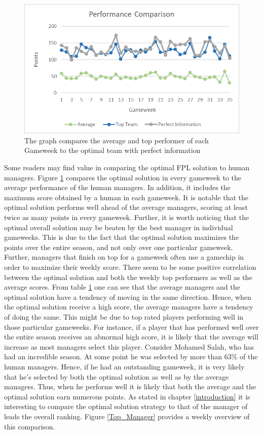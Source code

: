 \begin{figure}[H]
\label{fig:Comparison}
    \centering
    \includegraphics[scale=0.75]{fig/chapter_7/Comparison.png}
    \caption{The graph compares the average and top performer of each Gameweek to the optimal team with perfect information}
\label{Figure_Comparison}    
\end{figure}

Some readers may find value in comparing the optimal FPL solution to human managers. Figure \ref{Figure_Comparison} compares the optimal solution in every gameweek to the average performance of the human managers. In addition, it includes the maximum score obtained by a human in each gameweek. It is notable that the optimal solution performs well ahead of the average managers, scoring at least twice as many points in every gameweek. Further, it is worth noticing that the optimal overall solution may be beaten by the best manager in individual gameweeks. This is due to the fact that the optimal solution maximizes the points over the entire season, and not only over one particular gameweek. Further, managers that finish on top for a gameweek often use a gamechip in order to maximize their weekly score. 
\newpar
There seem to be some positive correlation between the optimal solution and both the weekly top performers as well as the average scores. From table \ref{Figure_Comparison} one can see that the average managers and the optimal solution have a tendency of moving in the same direction. Hence, when the optimal solution receive a high score, the average managers have a tendency of doing the same. This might be due to top rated players performing well in those particular gameweeks. For instance, if a player that has performed well over the entire season receives an abnormal high score, it is likely that the average will increase as most managers select this player. Consider Mohamed Salah, who has had an incredible season. At some point he was selected by more than 63\% of the human managers. Hence, if he had an outstanding gameweek, it is very likely that he's selected by both the optimal solution as well as by the average managers. Thus, when he performs well it is likely that both the average and the optimal solution earn numerous points. 
\newpar
As stated in chapter \ref{introduction} it is interesting to compare the optimal solution strategy to that of the manager of leads the overall ranking. Figure \ref{Top_Manager} provides a weekly overview of this comparison.

